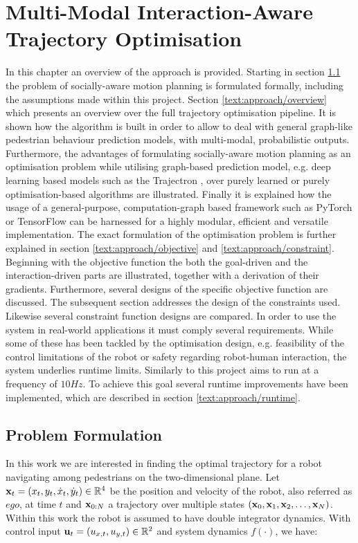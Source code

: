 \chapter{Multi-Modal Interaction-Aware Trajectory Optimisation}
\label{text:approach}
In this chapter an overview of the approach is provided. Starting in section \ref{text:approach/formulation} the problem of socially-aware motion planning is formulated formally, including the assumptions made within this project. 
\newline
Section \ref{text:approach/overview} which presents an overview over the full trajectory optimisation pipeline. It is shown how the algorithm is built in order to allow to deal with general graph-like pedestrian behaviour prediction models, with multi-modal, probabilistic outputs. Furthermore, the advantages of formulating socially-aware motion planning as an optimisation problem while utilising graph-based prediction model, e.g. deep learning based models such as the Trajectron \cite{Ivanovic18}, over purely learned \cite{Chen2017} or purely optimisation-based \cite{Berg2011} algorithms are illustrated. Finally it is explained how the usage of a general-purpose, computation-graph based framework such as PyTorch \cite{pytorch} or TensorFlow \cite{tensorflow} can be harnessed for a highly modular, efficient and versatile implementation.
\newline
The exact formulation of the optimisation problem is further explained in section \ref{text:approach/objective} and \ref{text:approach/constraint}. Beginning with the objective function the both the goal-driven and the interaction-driven parts are illustrated, together with a derivation of their gradients. Furthermore, several designs of the specific objective function are discussed. The subsequent section addresses the design of the constraints used. Likewise several constraint function designs are compared. 
\newline
In order to use the system in real-world applications it must comply several requirements. While some of these has been tackled by the optimisation design, e.g. feasibility of the control limitations of the robot or safety regarding robot-human interaction, the system underlies runtime limits. Similarly to \cite{Chen2017} this project aims to run at a frequency of $10 Hz$. To achieve this goal several runtime improvements have been implemented, which are described in section \ref{text:approach/runtime}.


\section{Problem Formulation}
\label{text:approach/formulation}
In this work we are interested in finding the optimal trajectory for a robot navigating among pedestrians on the two-dimensional plane. Let $\mathbf{x}_t = (x_t, y_t, \dot{x}_t, \dot{y}_t) \in \mathbb{R}^4 $ be the position and velocity of the robot, also referred as $ego$, at time $t$ and $\mathbf{x}_{0:N}$ a trajectory over multiple states $(\mathbf{x}_0, \mathbf{x}_1, \mathbf{x}_2, \hdots, \mathbf{x}_N)$. Within this work the robot is assumed to have double integrator dynamics. With control input $\mathbf{u}_t = (u_{x, t}, u_{y, t}) \in \mathbb{R}^2$ and system dynamics $f(\cdot)$, we have: 

